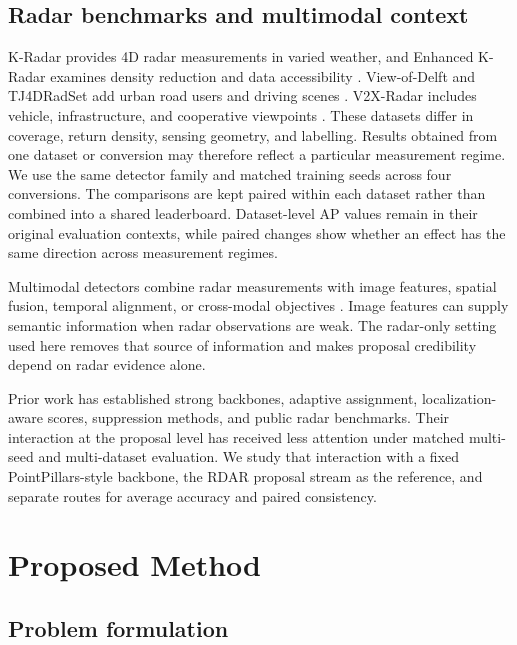 \documentclass[sensors,article,submit,pdftex,moreauthors]{Definitions/mdpi}
\begin{document}
\subsection{Radar benchmarks and multimodal context}

K-Radar provides 4D radar measurements in varied weather, and Enhanced K-Radar
examines density reduction and data accessibility
\cite{paek2022kradar,paek2023enhancedkradar}. View-of-Delft and TJ4DRadSet add
urban road users and driving scenes
\cite{palffy2022viewofdelft,zheng2022tj4dradset}. V2X-Radar includes vehicle,
infrastructure, and cooperative viewpoints \cite{yang2024v2xradar}. These
datasets differ in coverage, return density, sensing geometry, and labelling.
Results obtained from one dataset or conversion may therefore reflect a
particular measurement regime. We use the same detector family and matched
training seeds across four conversions. The comparisons are kept paired within
each dataset rather than combined into a shared leaderboard. Dataset-level AP
values remain in their original evaluation contexts, while paired changes show
whether an effect has the same direction across measurement regimes.

Multimodal detectors combine radar measurements with image features, spatial
fusion, temporal alignment, or cross-modal objectives
\cite{long2023radiant,nobis2021radarvoxelfusion,vora2020pointpainting,
montiel2024pointcloudpainting,nabati2021centerfusion,piergiovanni2021fourDnet,
deng2024crossmodal,zhang2024contrastiveradar}. Image features can supply semantic
information when radar observations are weak. The radar-only setting used here
removes that source of information and makes proposal credibility depend on
radar evidence alone.

Prior work has established strong backbones, adaptive assignment,
localization-aware scores, suppression methods, and public radar benchmarks.
Their interaction at the proposal level has received less attention under
matched multi-seed and multi-dataset evaluation. We study that interaction with
a fixed PointPillars-style backbone, the RDAR proposal stream as the reference,
and separate routes for average accuracy and paired consistency.

\section{Proposed Method}

\subsection{Problem formulation}
\end{document}
